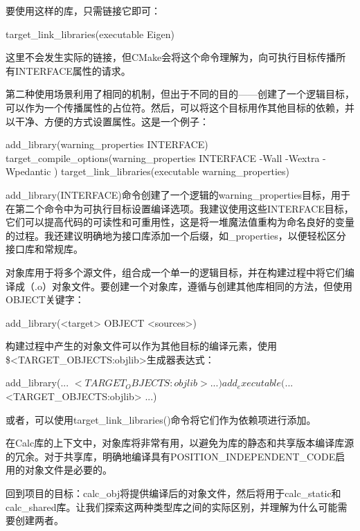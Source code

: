 要使用这样的库，只需链接它即可：

\begin{cmake}
target_link_libraries(executable Eigen)
\end{cmake}

这里不会发生实际的链接，但CMake会将这个命令理解为，向可执行目标传播所有INTERFACE属性的请求。

第二种使用场景利用了相同的机制，但出于不同的目的——创建了一个逻辑目标，可以作为一个传播属性的占位符。然后，可以将这个目标用作其他目标的依赖，并以干净、方便的方式设置属性。这是一个例子：

\begin{cmake}
add_library(warning_properties INTERFACE)
target_compile_options(warning_properties INTERFACE
    -Wall -Wextra -Wpedantic
)
target_link_libraries(executable warning_properties)
\end{cmake}

add\_library(INTERFACE)命令创建了一个逻辑的warning\_properties目标，用于在第二个命令中为可执行目标设置编译选项。我建议使用这些INTERFACE目标，它们可以提高代码的可读性和可重用性，这是将一堆魔法值重构为命名良好的变量的过程。我还建议明确地为接口库添加一个后缀，如\_properties，以便轻松区分接口库和常规库。


对象库用于将多个源文件，组合成一个单一的逻辑目标，并在构建过程中将它们编译成（.o）对象文件。要创建一个对象库，遵循与创建其他库相同的方法，但使用OBJECT关键字：

\begin{shell}
add_library(<target> OBJECT <sources>)
\end{shell}

构建过程中产生的对象文件可以作为其他目标的编译元素，使用\$<TARGET\_OBJECTS:objlib>生成器表达式：

\begin{shell}
add_library(... $<TARGET_OBJECTS:objlib> ...)
add_executable(... $<TARGET_OBJECTS:objlib> ...)
\end{shell}

或者，可以使用target\_link\_libraries()命令将它们作为依赖项进行添加。

在Calc库的上下文中，对象库将非常有用，以避免为库的静态和共享版本编译库源的冗余。对于共享库，明确地编译具有POSITION\_INDEPENDENT\_CODE启用的对象文件是必要的。

回到项目的目标：calc\_obj将提供编译后的对象文件，然后将用于calc\_static和calc\_shared库。让我们探索这两种类型库之间的实际区别，并理解为什么可能需要创建两者。

